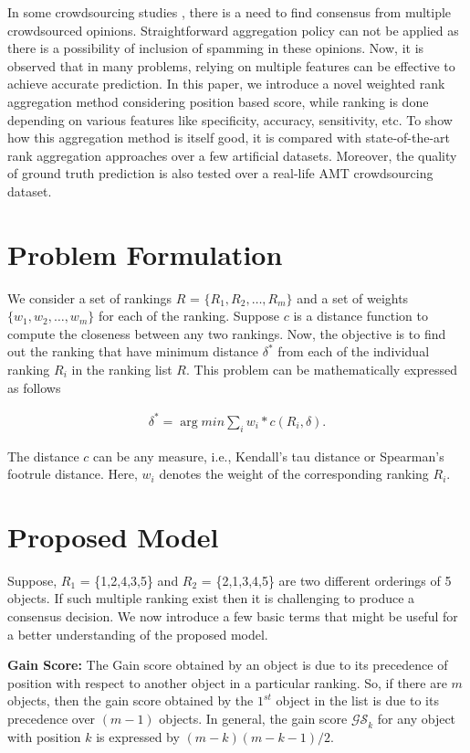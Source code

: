 \documentclass[letterpaper]{article}
\begin{document}
In some crowdsourcing studies \cite{Hovy2013,Ipeirotis2010,Liu2013,Nguyen16-hcomp,ChatterjeeS2017}, there is a need to find consensus from multiple crowdsourced opinions. Straightforward aggregation policy can not be applied as there is a possibility of inclusion of spamming in these opinions. Now, it is observed that in many problems, relying on multiple features can be effective to achieve accurate prediction. In this paper, we introduce a novel weighted rank aggregation method considering position based score, while ranking is done depending on various features like specificity, accuracy, sensitivity, etc. To show how this aggregation method is itself good, it is compared with state-of-the-art rank aggregation approaches over a few artificial datasets. Moreover, the quality of ground truth prediction is also tested over a real-life AMT crowdsourcing dataset.




\section{Problem Formulation}
We consider a set of rankings $R$ = $\{R_1, R_2, \ldots, R_m\}$ and a set of weights $\{w_1, w_2, \ldots, w_m\}$ for each of the ranking. Suppose $c$ is a distance function to compute the closeness between any two rankings. Now, the objective is to find out the ranking that have minimum distance $\delta^* $ from each of the individual ranking $R_i$ in the ranking list $R$. This problem can be mathematically expressed as follows

\begin{eqnarray}
\delta^* = \arg min {\sum_{i} w_i*c(R_i,\delta)}.
\end{eqnarray}

The distance $c$ can be any measure, i.e., Kendall's tau distance or Spearman's footrule distance. Here, $w_i$ denotes the weight of the corresponding ranking $R_i$.




\section{Proposed Model}
Suppose, $R_1$ = \{1,2,4,3,5\} and $R_2$ = \{2,1,3,4,5\} are two different orderings of 5 objects. If such multiple ranking exist then it is challenging to produce a consensus decision. We now introduce a few basic terms that might be useful for a better understanding of the proposed model.

{\bf Gain Score:} The Gain score obtained by an object is due to its precedence of position with respect to another object in a particular ranking. So, if there are $m$ objects, then the gain score obtained by the $1^{st}$ object in the list is due to its precedence over $(m-1)$ objects.
In general, the gain score $\mathcal{GS}_k$ for any object with position $k$ is expressed by $(m-k)(m-k-1)/2$. %
\end{document}
